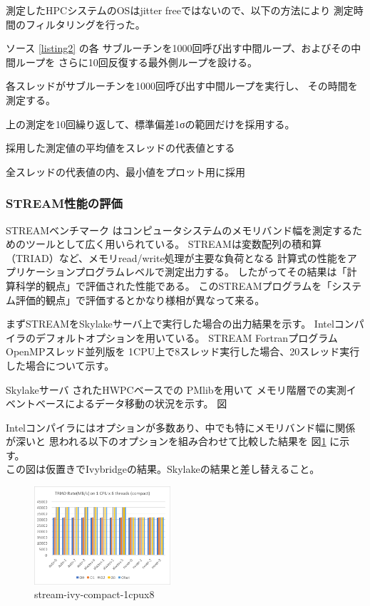 \documentclass[submit,techrep,noauthor]{ipsj}
\begin{document}
測定したHPCシステムのOSはjitter freeではないので、以下の方法により
測定時間のフィルタリングを行った。

ソース \lstlistingname \ref{listing2} の各
サブルーチンを1000回呼び出す中間ループ、およびその中間ループを
さらに10回反復する最外側ループを設ける。
\begin{itemize}
{
\item {各スレッドがサブルーチンを1000回呼び出す中間ループを実行し、
		その時間を測定する。}
\item {上の測定を10回繰り返して、標準偏差1σの範囲だけを採用する。}
\item {採用した測定値の平均値をスレッドの代表値とする}
\item {全スレッドの代表値の内、最小値をプロット用に採用}
}
\end{itemize}






\subsubsection{STREAM性能の評価}
STREAMベンチマーク\cite{stream:1995}
はコンピュータシステムのメモリバンド幅を測定するためのツールとして広く用いられている。
STREAMは変数配列の積和算（TRIAD）など、メモリread/write処理が主要な負荷となる
計算式の性能をアプリケーションプログラムレベルで測定出力する。
したがってその結果は「計算科学的観点」で評価された性能である。
このSTREAMプログラムを「システム評価的観点」で評価するとかなり様相が異なって来る。

まずSTREAMをSkylakeサーバ上で実行した場合の出力結果を示す。
Intelコンパイラのデフォルトオプションを用いている。
STREAM FortranプログラムOpenMPスレッド並列版を
1CPU上で8スレッド実行した場合、20スレッド実行した場合について示す。


Skylakeサーバ
されたHWPCベースでの
PMlibを用いて
メモリ階層での実測イベントベースによるデータ移動の状況を示す。
図



Intelコンパイラにはオプションが多数あり、中でも特にメモリバンド幅に関係が深いと
思われる以下のオプションを組み合わせて比較した結果を
図\ref{fig:stream-ivy-compact-1cpux8} に示す。\\
{\color{blue}この図は仮置きでIvybridgeの結果。Skylakeの結果と差し替えること。}

\begin{figure}[tb]
\centering\includegraphics[width=0.45\textwidth]{figs/stream-ivy-compact-1cpux8.png}
\caption{stream-ivy-compact-1cpux8}
\label{fig:stream-ivy-compact-1cpux8}
\end{figure}
\end{document}
